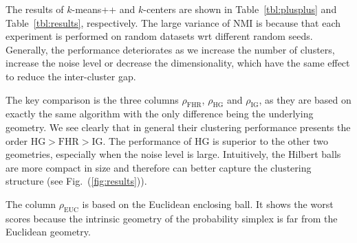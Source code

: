 \documentclass[graybox]{svmult}
\begin{document}
The results of $k$-means++ and $k$-centers are shown in Table~\ref{tbl:plusplus}
and Table~\ref{tbl:results}, respectively. The large variance of NMI is because
that each experiment is performed on random datasets wrt different random seeds.
Generally, the performance deteriorates as we increase the number of clusters,
increase the noise level or decrease the dimensionality,
which have the same effect to reduce the inter-cluster gap.

The key comparison is the three columns $\rho_{\mathrm{FHR}}$, $\rho_{\mathrm{HG}}$
and $\rho_{\mathrm{IG}}$, as they are based on exactly the same algorithm
with the only difference being the underlying geometry.
We see clearly that in general their clustering performance presents the order $\mathrm{HG}>\mathrm{FHR}>\mathrm{IG}$.
The performance of HG is superior to the other two geometries, especially when the noise level is large.
Intuitively, the Hilbert balls are more compact in size and
therefore can better capture the clustering structure (see Fig.~(\ref{fig:results})).


The column $\rho_{\mathrm{EUC}}$ is based on the Euclidean enclosing
ball. It shows the worst scores because the intrinsic geometry of the
probability simplex is far from the Euclidean geometry.

\end{document}

